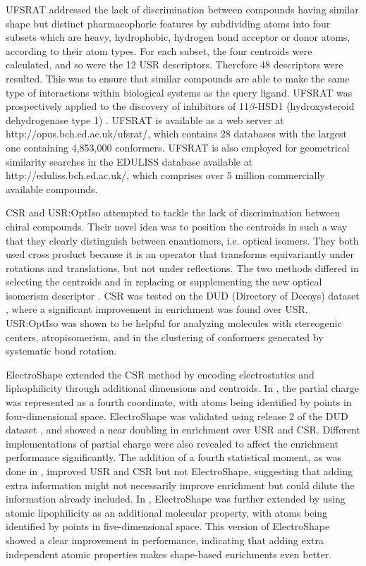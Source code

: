 UFSRAT \citep{1436} addressed the lack of discrimination between compounds having similar shape but distinct pharmacophoric features by subdividing atoms into four subsets which are heavy, hydrophobic, hydrogen bond acceptor or donor atoms, according to their atom types. For each subset, the four centroids were calculated, and so were the 12 USR descriptors. Therefore 48 descriptors were resulted. This was to ensure that similar compounds are able to make the same type of interactions within biological systems as the query ligand. UFSRAT was prospectively applied to the discovery of inhibitors of 11$\beta$-HSD1 (hydroxysteroid dehydrogenase type 1) \citep{1505}. UFSRAT is available as a web server at http://opus.bch.ed.ac.uk/ufsrat/, which contains 28 databases with the largest one containing 4,853,000 conformers. UFSRAT is also employed for geometrical similarity searches in the EDULISS database \citep{1437} available at http://eduliss.bch.ed.ac.uk/, which comprises over 5 million commercially available compounds.

CSR \citep{1334} and USR:OptIso \citep{1335} attempted to tackle the lack of discrimination between chiral compounds. Their novel idea was to position the centroids in such a way that they clearly distinguish between enantiomers, i.e. optical isomers. They both used cross product because it is an operator that transforms equivariantly under rotations and translations, but not under reflections. The two methods differed in selecting the centroids and in replacing or supplementing the new optical isomerism descriptor \citep{1335}. CSR \citep{1334} was tested on the DUD (Directory of Decoys) dataset \citep{87}, where a significant improvement in enrichment was found over USR. USR:OptIso \citep{1335} was shown to be helpful for analyzing molecules with stereogenic centers, atropisomerism, and in the clustering of conformers generated by systematic bond rotation.

ElectroShape \citep{1337,1338} extended the CSR \citep{1334} method by encoding electrostatics and liphophilicity through additional dimensions and centroids. In \citep{1337}, the partial charge was represented as a fourth coordinate, with atoms being identified by points in four-dimensional space. ElectroShape was validated using release 2 of the DUD dataset \citep{87}, and showed a near doubling in enrichment over USR and CSR. Different implementations of partial charge were also revealed to affect the enrichment performance significantly. The addition of a fourth statistical moment, as was done in \citep{1333}, improved USR and CSR but not ElectroShape, suggesting that adding extra information might not necessarily improve enrichment but could dilute the information already included. In \citep{1338}, ElectroShape was further extended by using atomic lipophilicity as an additional molecular property, with atoms being identified by points in five-dimensional space. This version of ElectroShape showed a clear improvement in performance, indicating that adding extra independent atomic properties makes shape-based enrichments even better.

